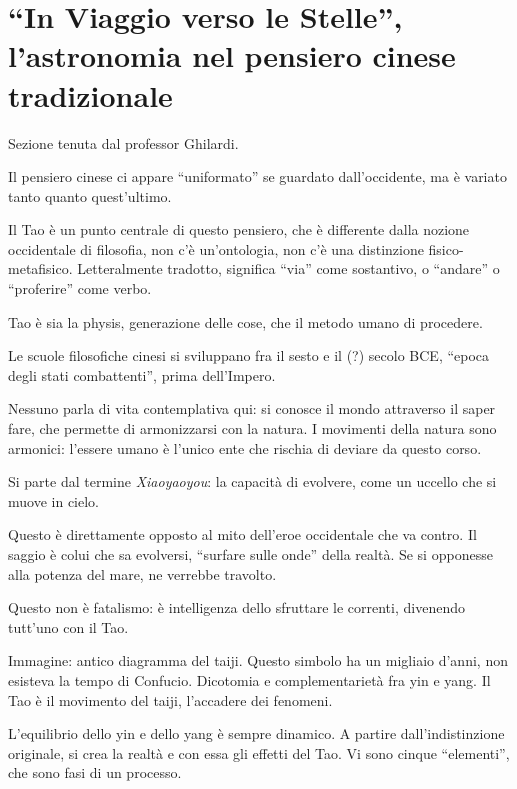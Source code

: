 \documentclass[main.tex]{subfiles}
\begin{document}

\section{``In Viaggio verso le Stelle'', l'astronomia nel pensiero cinese tradizionale}

Sezione tenuta dal professor Ghilardi. 

Il pensiero cinese ci appare ``uniformato'' se guardato dall'occidente, ma è variato tanto quanto quest'ultimo. 

Il Tao è un punto centrale di questo pensiero, che è differente dalla nozione occidentale di filosofia, non c'è un'ontologia, non c'è una distinzione fisico-metafisico. 
Letteralmente tradotto, significa ``via'' come sostantivo, o ``andare'' o ``proferire'' come verbo. 

Tao è sia la physis, generazione delle cose, che il metodo umano di procedere. 

Le scuole filosofiche cinesi si sviluppano fra il sesto e il (?) secolo BCE,
``epoca degli stati combattenti'', prima dell'Impero. 

Nessuno parla di vita contemplativa qui: si conosce il mondo attraverso il saper fare, che permette di armonizzarsi con la natura. 
I movimenti della natura sono armonici: l'essere umano è l'unico ente che rischia di deviare da questo corso. 

Si parte dal termine \emph{Xiaoyaoyou}: la capacità di evolvere, come un uccello che si muove in cielo. 

Questo è direttamente opposto al mito dell'eroe occidentale che va contro. 
Il saggio è colui che sa evolversi, ``surfare sulle onde'' della realtà. 
Se si opponesse alla potenza del mare, ne verrebbe travolto. 

Questo non è fatalismo: è intelligenza dello sfruttare le correnti, divenendo tutt'uno con il Tao. 

Immagine: antico diagramma del taiji. 
Questo simbolo ha un migliaio d'anni, non esisteva la tempo di Confucio. 
Dicotomia e complementarietà fra yin e yang. 
Il Tao è il movimento del taiji, l'accadere dei fenomeni. 

L'equilibrio dello yin e dello yang è sempre dinamico. 
A partire dall'indistinzione originale, si crea la realtà e con essa gli effetti del Tao.
Vi sono cinque ``elementi'', che sono fasi di un processo.
\end{document}
